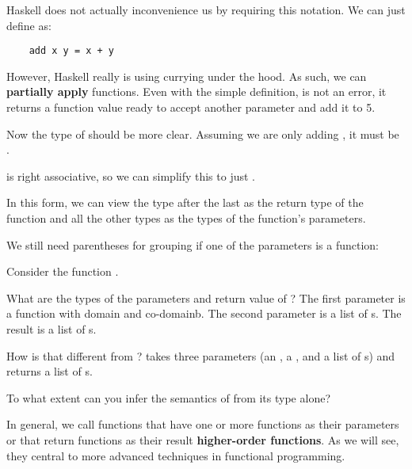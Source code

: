 \begin{notelist}
    \item Haskell does not actually inconvenience us by requiring this notation. We can just define  as:
    \begin{lstlisting} 
    add x y = x + y
    \end{lstlisting} 

    \item However, Haskell really is using currying under the hood. As such, we can \textbf{partially apply}
          functions. Even with the simple definition,  is not an error, it returns a function value
          ready to accept another parameter and add it to 5.

    \item Now the type of  should be more clear. Assuming we are only adding , it must
          be . 

    \item \code{->} is right associative, so we can simplify this to just .

    \item In this form, we can view the type after the last \code{->} as the return type of the function and
          all the other types as the types of the function's parameters.

    \item We still need parentheses for grouping if one of the parameters is a function:
    \begin{notelist}
        \item Consider the function .
        \item What are the types of the parameters and return value of ? The first parameter is a function
              with domain  and co-domain{b}. The second parameter is a list of s. The result
              is a list of s.
        \item How is that different from ?  takes three parameters
              (an , a , and a list of s) and returns a list of s.
        \item To what extent can you infer the semantics of  from its type alone?
    \end{notelist}
    
    \item In general, we call functions that have one or more functions as their parameters or that return functions
          as their result \textbf{higher-order functions}. As we will see, they central to more advanced techniques
          in functional programming.
\end{notelist}
